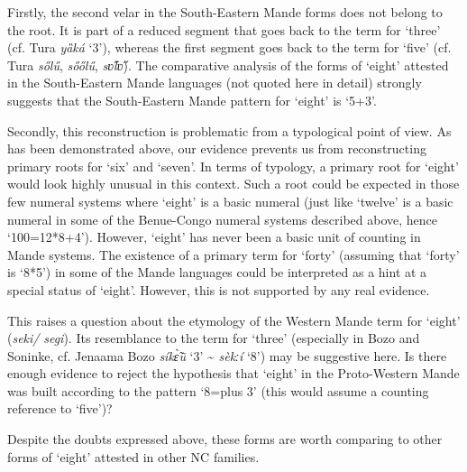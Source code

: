 Firstly, the second velar in the South-Eastern Mande forms does not belong to the root. It is part of a reduced segment that goes back to the term for ‘three’ (cf. Tura \textit{yȁká} ‘3’), whereas the first segment goes back to the term for ‘five’ (cf. Tura \textit{s{\H{o}}l{\H{u}}}, \textit{s{\H{o}}{\H{o}}l{\H{u}}}, \textit{s{\H{ʋ}}l{\H{ʋ}}}). The comparative analysis of the forms of ‘eight’ attested in the South-Eastern Mande languages (not quoted here in detail) strongly suggests that the South-Eastern Mande pattern for ‘eight’ is ‘5+3’. 

Secondly, this reconstruction is problematic from a typological point of view. As has been demonstrated above, our evidence prevents us from reconstructing primary roots for ‘six’ and ‘seven’. In terms of typology, a primary root for ‘eight’ would look highly unusual in this context. Such a root could be expected in those few numeral systems where ‘eight’ is a basic numeral (just like ‘twelve’ is a basic numeral in some of the Benue-Congo numeral systems described above, hence ‘100=12*8+4’). However, ‘eight’ has never been a basic unit of counting in Mande systems. The existence of a primary term for ‘forty’ (assuming that ‘forty’ is ‘8*5’) in some of the Mande languages could be interpreted as a hint at a special status of ‘eight’. However, this is not supported by any real evidence. 

This raises a question about the etymology of the Western Mande term for ‘eight’ (\textit{seki/} \textit{segi}). Its resemblance to the term for ‘three’ (especially in Bozo and Soninke, cf. Jenaama Bozo \textit{sík{\`{\~ɛ}}{\~{u}}} ‘3’ {\textasciitilde} \textit{sèkːí} ‘8’) may be suggestive here. Is there enough evidence to reject the hypothesis that ‘eight’ in the Proto-Western Mande was built according to the pattern ‘8=plus 3’ (this would assume a counting reference to ‘five’)?

Despite the doubts expressed above, these forms are worth comparing to other forms of ‘eight’ attested in other NC families.

 
